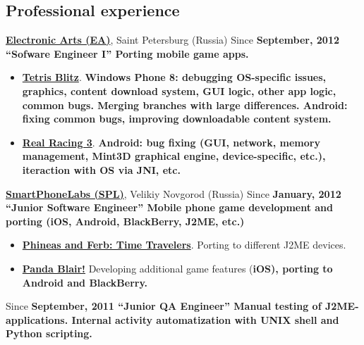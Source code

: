\begin{flushright}
\section{Professional experience}
{
\fontsize{14pt}{12pt}\selectfont
\href{http://www.ea.com}{\bfseries Electronic Arts (EA)\mdseries},
Saint Petersburg (Russia)
}
\subitem Since \bfseries September, 2012 \mdseries ``Sofware Engineer I''
\subitem Porting mobile game apps.
\begin{itemize}
\setlength{\itemindent}{20pt}
\item
    \href{http://www.windowsphone.com/en-us/store/app/tetris-blitz/806c88c7-528c-4563-9c0a-09ef31f14d61}
    {\bfseries Tetris Blitz\mdseries}. \bfseries Windows Phone 8\mdseries:
debugging OS-specific issues, graphics, content download system,
GUI logic, other app logic, common bugs.
Merging branches with large differences.\linebreak
\bfseries Android\mdseries: fixing common bugs,
    improving downloadable content system.
\item
    \href{http://www.facebook.com/realracing}
    {\bfseries Real Racing 3\mdseries}.
    \bfseries Android\mdseries: bug fixing
    (GUI, network, memory management, Mint3D graphical engine,
    device-specific, etc.), iteraction with OS via JNI, etc.
\end{itemize}

{
\vspace{15pt}
\fontsize{14pt}{12pt}\selectfont
\href{http://spl.co}{\bfseries SmartPhoneLabs (SPL)\mdseries},
Velikiy Novgorod (Russia)
}
\subitem Since \bfseries January, 2012 \mdseries ``Junior Software Engineer''
\subitem Mobile phone game development and porting
(iOS, Android, BlackBerry, J2ME, etc.)
\begin{itemize}
\setlength{\itemindent}{20pt}
\item
    \href{http://java.mob.org/game/phineas\_and\_ferb\_time\_travelers.html}
        {\bfseries Phineas and Ferb: Time Travelers\mdseries}.
        Porting to different J2ME devices.
\item
    \href{https://itunes.apple.com/us/app/panda-blair!/id500995558?mt=8}
        {\bfseries Panda Blair!\mdseries}
        Developing additional game features (\bfseries iOS\mdseries),
        porting to \bfseries Android \mdseries and \bfseries BlackBerry\mdseries.
\end{itemize}

\vspace{15pt}
\subitem Since \bfseries September, 2011 \mdseries ``Junior QA Engineer''
\subitem Manual testing of J2ME-applications.
\subitem Internal activity automatization with \bfseries UNIX shell \mdseries and \bfseries Python \mdseries scripting.


\end{flushright}
